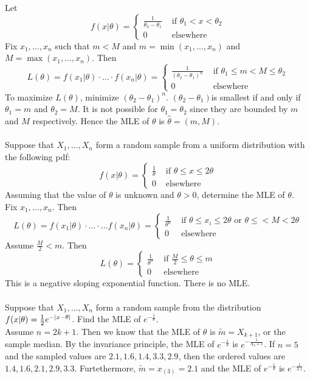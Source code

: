 \documentclass[12pt]{article}
\begin{document}
Let $$f(x|\theta) = \begin{cases} \frac{1}{\theta_2 - \theta_1} &\text{ if } \theta_1 < x < \theta_2 \\ 0 &\text{ elsewhere} \end{cases} $$ 
Fix $x_1,\dots,x_n$ such that $m<M$ and $m = \min(x_1,\dots,x_n)$ and $M = \max(x_1,\dots,x_n)$. Then $$L(\theta) = f(x_1|\theta) \cdot \dots \cdot f(x_n|\theta) = \begin{cases} \frac{1}{(\theta_2 - \theta_1)^n} &\text{ if } \theta_1 \leq m < M \leq \theta_2 \\ 0 &\text{ elsewhere} \end{cases} $$ 
To maximize $L(\theta)$, minimize $(\theta_2-\theta_1)^n$. $(\theta_2 - \theta_1)$is smallest if and only if $\theta_1 = m$ and $\theta_2 = M$. It is not possible for $\theta_1 = \theta_2$ since they are bounded by $m$ and $M$ respectively. Hence the MLE of $\theta$ is $\hat{\theta} = (m,M)$. \\~\\
Suppose that $X_1,\dots,X_n$ form a random sample from a uniform distribution with the following pdf: $$f(x|\theta) = \begin{cases} \frac{1}{\theta} &\text{ if } \theta \leq x \leq 2\theta \\ 0 &\text{ elsewhere} \end{cases} $$ 
Assuming that the value of $\theta$ is unknown and $\theta > 0$, determine the MLE of $\theta$. \\ 
Fix $x_1,\dots,x_n$. Then $$L(\theta) = f(x_1|\theta) \cdot \dots \cdot \dots f(x_n|\theta) = \begin{cases} \frac{1}{\theta^n} &\text{ if } \theta \leq x_i \leq 2\theta \text{ or } \theta \leq < M < 2\theta \\ 0 &\text{ elsewhere } \end{cases} $$ 
Assume $\frac{M}{2} < m$. Then 
$$L(\theta) = \begin{cases} \frac{1}{\theta^n} &\text{ if } \frac{M}{2} \leq \theta \leq m \\ 0 &\text{ elsewhere } \end{cases} $$ 
This is a negative sloping exponential function. There is no MLE. \\~\\
Suppose that $X_1,\dots,X_n$ form a random sample from the distribution $f(x |\theta) = \frac{1}{2}e^{-\abs{x-\theta}}$. Find the MLE of $e^{-\frac{1}{\theta}}$. \\
Assume $n = 2k+1$. Then we know that the MLE of $\theta$ is $\tilde{m} = X_{k+1}$, or the sample median. By the invariance principle, the MLE of $e^{-\frac{1}{\theta}}$ is $e^{-\frac{1}{X_k + 1}}$. If $n= 5$ and the sampled values are $2.1,1.6,1.4,3.3,2.9$, then the ordered values are $1.4,1.6,2.1,2.9,3.3$. Furtethermore, $\tilde{m} = x_{(3)} = 2.1$ and the MLE of $e^{-\frac{1}{\theta}}$ is $e^{-\frac{1}{2.1}}$. 
\end{document}
